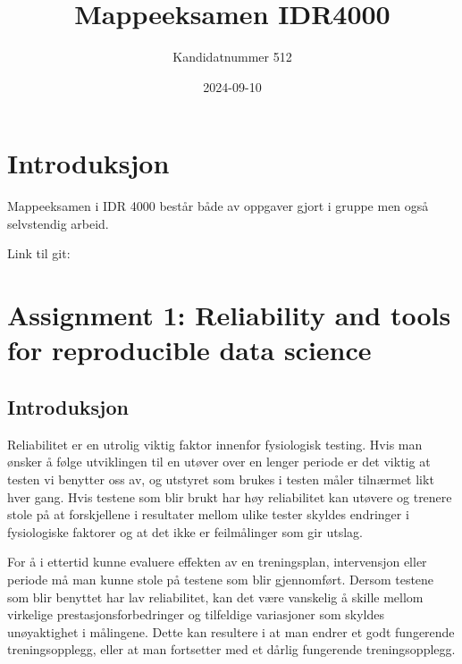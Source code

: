 \documentclass[
  letterpaper,
  DIV=11,
  numbers=noendperiod]{scrreprt}
\title{Mappeeksamen IDR4000}
\author{Kandidatnummer 512}
\date{2024-09-10}
\renewcommand*\contentsname{Table of contents}
\newcommand\contentsname{Table of contents}
\begin{document}
\maketitle

\renewcommand*\contentsname{Table of contents}
{
\hypersetup{linkcolor=}
\setcounter{tocdepth}{2}
\tableofcontents
}


\chapter*{Introduksjon}\label{introduksjon}


Mappeeksamen i IDR 4000 består både av oppgaver gjort i gruppe men også
selvstendig arbeid.

Link til git:


\chapter{Assignment 1: Reliability and tools for reproducible data
science}\label{assignment1}

\section{Introduksjon}\label{introduksjon-1}

Reliabilitet er en utrolig viktig faktor innenfor fysiologisk testing.
Hvis man ønsker å følge utviklingen til en utøver over en lenger periode
er det viktig at testen vi benytter oss av, og utstyret som brukes i
testen måler tilnærmet likt hver gang. Hvis testene som blir brukt har
høy reliabilitet kan utøvere og trenere stole på at forskjellene i
resultater mellom ulike tester skyldes endringer i fysiologiske faktorer
og at det ikke er feilmålinger som gir utslag.

For å i ettertid kunne evaluere effekten av en treningsplan,
intervensjon eller periode må man kunne stole på testene som blir
gjennomført. Dersom testene som blir benyttet har lav reliabilitet, kan
det være vanskelig å skille mellom virkelige prestasjonsforbedringer og
tilfeldige variasjoner som skyldes unøyaktighet i målingene. Dette kan
resultere i at man endrer et godt fungerende treningsopplegg, eller at
man fortsetter med et dårlig fungerende treningsopplegg.
\end{document}
